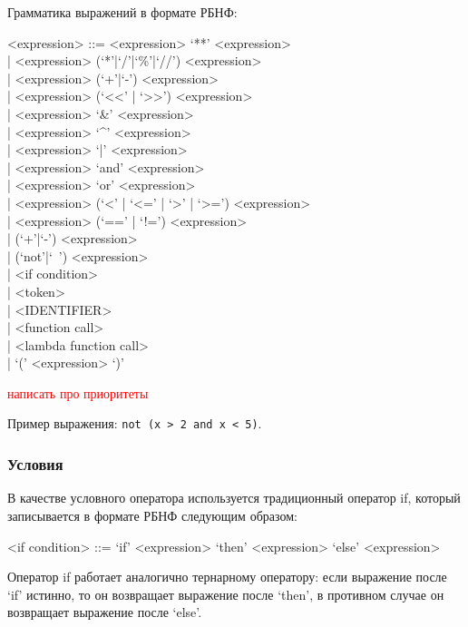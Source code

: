 \documentclass[12pt,a4paper,oneside]{extarticle}
\begin{document}
            Грамматика выражений в формате РБНФ:
            \begin{grammar}
                <expression> ::=
                      <expression> `**' <expression> \\
                    | <expression> (`*'|`/'|`\%'|`//') <expression> \\
                    | <expression> (`+'|`-') <expression> \\
                    | <expression> (`\textless\null\textless' | `\textgreater\null\textgreater') <expression> \\
                    | <expression> `&' <expression> \\
                    | <expression> `^' <expression> \\
                    | <expression> `|' <expression> \\
                    | <expression> `and' <expression> \\
                    | <expression> `or' <expression> \\
                    | <expression> (`\textless' | `\textless=' | `\textgreater' | `\textgreater=') <expression> \\
                    | <expression> (`==' | `!=') <expression> \\
                    | (`+'|`-') <expression> \\
                    | (`not'|`~') <expression> \\
                    | <if condition> \\
                    | <token> \\
                    | <IDENTIFIER> \\
                    | <function call> \\
                    | <lambda function call> \\
                    | `(' <expression> `)'
            \end{grammar}

            \textcolor{red}{написать про приоритеты}

            Пример выражения: \lstinline$not (x > 2 and x < 5)$.

        \subsubsection{Условия}
            В качестве условного оператора используется традиционный оператор if, который записывается в формате РБНФ следующим образом:
            \begin{grammar}
                <if condition> ::= `if' <expression> `then' <expression> `else' <expression>
            \end{grammar}
            Оператор if работает аналогично тернарному оператору: если выражение после `if' истинно, то он возвращает выражение после `then', в противном случае он возвращает выражение после `else'.
\end{document}
